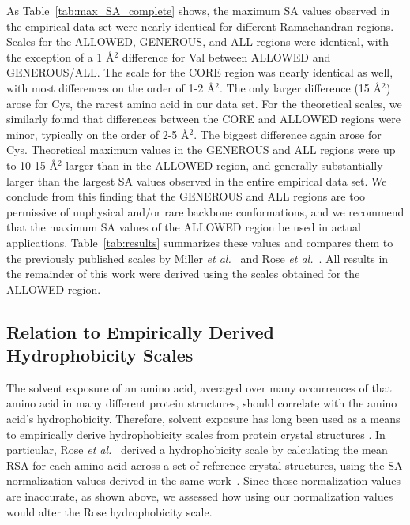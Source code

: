 \documentclass[11pt]{article}
\begin{document}
As Table~\ref{tab:max_SA_complete} shows, the maximum SA values observed in the empirical data set were nearly identical for different Ramachandran regions. Scales for the ALLOWED, GENEROUS, and ALL regions were identical, with the exception of a 1 \AA$^2$ difference for Val between ALLOWED and GENEROUS/ALL. The scale for the CORE region was nearly identical as well, with most differences on the order of 1-2 \AA$^2$. The only larger difference (15 \AA$^2$) arose for Cys, the rarest amino acid in our data set. For the theoretical scales, we similarly found that differences between the CORE and ALLOWED regions were minor, typically on the order of 2-5 \AA$^2$. The biggest difference again arose for Cys. Theoretical maximum values in the GENEROUS and ALL regions were up to 10-15 \AA$^2$ larger than in the ALLOWED region, and generally substantially larger than the largest SA values observed in the entire empirical data set. We conclude from this finding that the GENEROUS and ALL regions are too permissive of unphysical and/or rare backbone conformations, and we recommend that the maximum SA values of the ALLOWED region be used in actual applications. Table~\ref{tab:results} summarizes these values and compares them to the previously published scales by Miller \emph{et al.}~\cite{Miller1987} and Rose \emph{et al.}~\cite{Rose1985}. All results in the remainder of this work were derived using the scales obtained for the ALLOWED region.

\subsection*{Relation to Empirically Derived Hydrophobicity Scales}

The solvent exposure of an amino acid, averaged over many occurrences of that amino acid in many different protein structures, should correlate with the amino acid's hydrophobicity. Therefore, solvent exposure has long been used as a means to empirically derive hydrophobicity scales from protein crystal structures \cite{Chothia1976,Rose1985}. In particular, Rose \emph{et al.}~\cite{Rose1985} derived a hydrophobicity scale by calculating the mean RSA for each amino acid across a set of reference crystal structures, using the SA normalization values derived in the same work~\cite{Rose1985}. Since those normalization values are inaccurate, as shown above, we assessed how using our normalization values would alter the Rose hydrophobicity scale.
\end{document}
